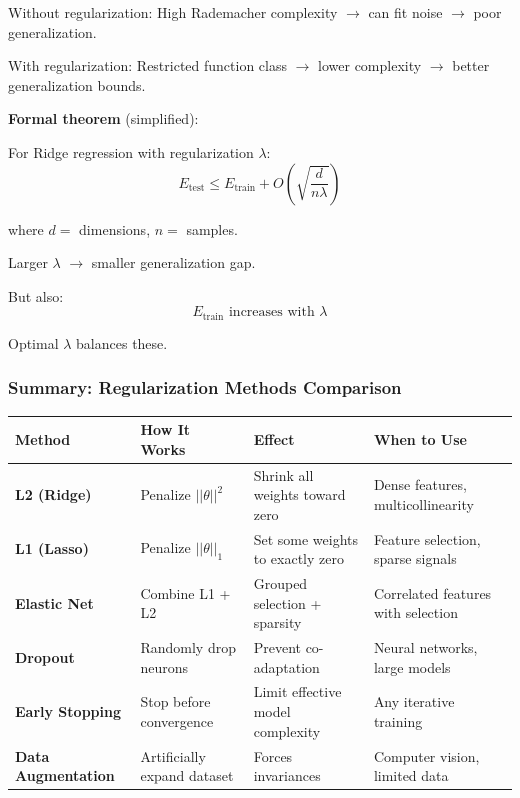 \documentclass[11pt,oneside]{book}
\begin{document}
Without regularization: High Rademacher complexity $\rightarrow$ can fit noise $\rightarrow$ poor generalization.

With regularization: Restricted function class $\rightarrow$ lower complexity $\rightarrow$ better generalization bounds.

\textbf{Formal theorem} (simplified):

For Ridge regression with regularization $\lambda$:
\begin{equation}
E_{\text{test}} \leq E_{\text{train}} + O\left(\sqrt{\frac{d}{n\lambda}}\right)
\end{equation}

where $d =$ dimensions, $n =$ samples.

Larger $\lambda$ $\rightarrow$ smaller generalization gap.

But also:
\begin{equation}
E_{\text{train}} \text{ increases with } \lambda
\end{equation}

Optimal $\lambda$ balances these.

\subsubsection{Summary: Regularization Methods Comparison}

\begin{table}[h]
\centering
\small
\begin{tabular}{p{2.5cm}p{3.5cm}p{2.5cm}p{3.5cm}}
\toprule
\textbf{Method} & \textbf{How It Works} & \textbf{Effect} & \textbf{When to Use} \\
\midrule
\textbf{L2 (Ridge)} & Penalize $||\theta||^2$ & Shrink all weights toward zero & Dense features, multicollinearity \\
\textbf{L1 (Lasso)} & Penalize $||\theta||_1$ & Set some weights to exactly zero & Feature selection, sparse signals \\
\textbf{Elastic Net} & Combine L1 + L2 & Grouped selection + sparsity & Correlated features with selection \\
\textbf{Dropout} & Randomly drop neurons & Prevent co-adaptation & Neural networks, large models \\
\textbf{Early Stopping} & Stop before convergence & Limit effective model complexity & Any iterative training \\
\textbf{Data Augmentation} & Artificially expand dataset & Forces invariances & Computer vision, limited data \\
\bottomrule
\end{tabular}
\end{table}
\end{document}
